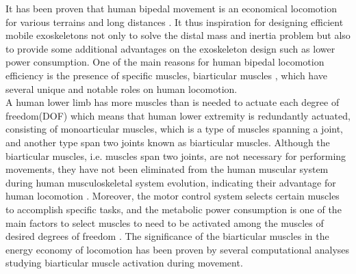 \documentclass[10pt,letterpaper]{article}
\begin{document}
It has been proven that human bipedal movement is an economical locomotion \cite{1,48} for various terrains \cite{1,49} and long distances \cite{50}. It thus inspiration for designing efficient mobile exoskeletons not only to solve the distal mass and inertia problem but also to provide some additional advantages on the exoskeleton design such as lower power consumption. One of the main reasons for human bipedal locomotion efficiency is the presence of specific muscles, biarticular muscles \cite{51,52,53}, which have several unique and notable roles on human locomotion.\\
A human lower limb has more muscles than is needed to actuate each degree of freedom(DOF) \cite{53} which means that human lower extremity is redundantly actuated, consisting of monoarticular muscles, which is a type of muscles spanning a joint, and another type span two joints known as biarticular muscles. Although the biarticular muscles, i.e. muscles span two joints, are not necessary for performing movements, they have not been eliminated from the human muscular system during human musculoskeletal system evolution, indicating their advantage for human locomotion \cite{53}. Moreover, the motor control system selects certain muscles to accomplish specific tasks\cite{54}, and the metabolic power consumption is one of the main factors to select muscles to need to be activated among the muscles of desired degrees of freedom \cite{53}. The significance of the biarticular muscles in the energy economy of locomotion has been proven by several computational analyses\cite{55,56} studying biarticular muscle activation during movement.\\
\end{document}
